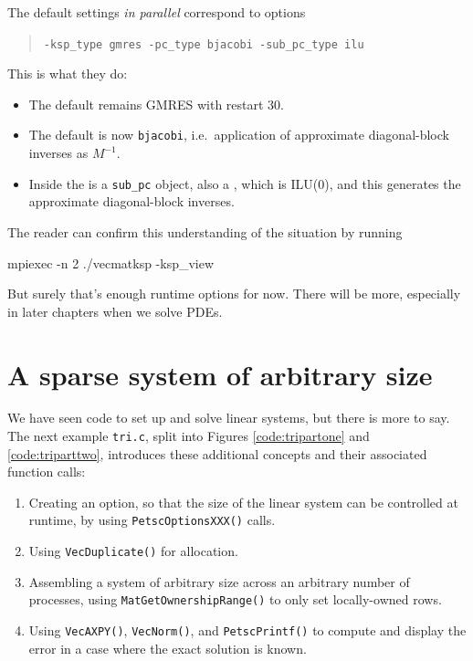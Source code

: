 The default \PETSc \pKSP settings \emph{in parallel} correspond to options
\begin{quote}
\texttt{-ksp\_type gmres -pc\_type bjacobi -sub\_pc\_type ilu}
\end{quote}
This is what they do:
\begin{itemize}
\item The default \pKSP remains GMRES with restart 30.
\item The default \pPC is now \texttt{bjacobi}, i.e.~application of approximate diagonal-block inverses as $M^{-1}$.
\item Inside the \pPC is a \texttt{sub\_pc} object, also a \pPC, which is ILU($0$), and this generates the approximate diagonal-block inverses.
\end{itemize}
The reader can confirm this understanding of the situation by running
\begin{cline}
mpiexec -n 2 ./vecmatksp -ksp_view
\end{cline}

But surely that's enough runtime options for now.  There will be more, especially in later chapters when we solve PDEs.


\section{A sparse system of arbitrary size}

We have seen \PETSc code to set up and solve linear systems, but there is more to say.  The next example \texttt{tri.c}, split into Figures \ref{code:tripartone} and \ref{code:triparttwo}, introduces these additional concepts and their associated function calls:
\begin{enumerate}
\item Creating an option, so that the size of the linear system can be controlled at runtime, by using \texttt{PetscOptionsXXX()} calls.
\item Using \texttt{VecDuplicate()} for allocation.
\item Assembling a system of arbitrary size across an arbitrary number of processes, using \texttt{MatGetOwnershipRange()} to only set locally-owned rows.
\item Using \texttt{VecAXPY()}, \texttt{VecNorm()}, and \texttt{PetscPrintf()} to compute and display the error in a case where the exact solution is known.
\end{enumerate}

